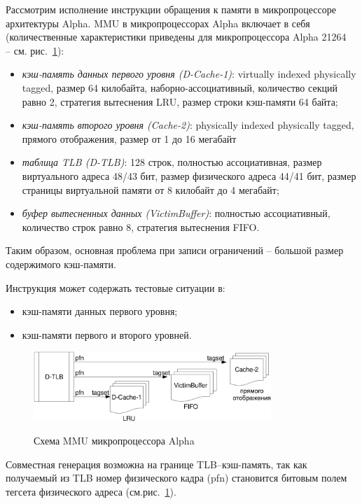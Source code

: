 \documentclass[14pt]{extreport}
\newcommand{\LRU}{\textsf{LRU}\xspace}
\newcommand{\FIFO}{\textsf{FIFO}\xspace}
\begin{document}
Рассмотрим исполнение инструкции обращения к памяти в
микропроцессоре архитектуры Alpha. MMU в микропроцессорах Alpha
включает в себя  (количественные характеристики приведены для
микропроцессора Alpha 21264~\cite{HennessyPatterson3rd} -- см.
рис.~\ref{alpha_mmu_scheme}):
\begin{itemize}
  \item \emph{кэш-память данных первого уровня (D-Cache-1)}:
  virtually indexed physically tagged, размер 64 килобайта,
  наборно-ассоциативный, количество секций равно 2, стратегия вытеснения
  \LRU, размер строки кэш-памяти 64 байта;
  \item \emph{кэш-память второго уровня (Cache-2)}: physically
  indexed physically tagged, прямого отображения, размер от 1 до 16
  мегабайт
  \item \emph{таблица TLB (D-TLB)}: 128 строк, полностью
  ассоциативная, размер виртуального адреса 48/43 бит, размер физического адреса
  44/41 бит, размер страницы виртуальной памяти от 8 килобайт до 4
  мегабайт;
  \item \emph{буфер вытесненных данных (VictimBuffer)}: полностью
  ассоциативный, количество строк равно 8, стратегия
  вытеснения \FIFO.
\end{itemize}
Таким образом, основная проблема при записи ограничений -- большой
размер содержимого кэш-памяти.

Инструкция может содержать тестовые ситуации в:
\begin{itemize}
  \item кэш-памяти данных первого уровня;
  \item кэш-памяти первого и второго уровней.
\end{itemize}

\begin{figure}[h] \center
  \includegraphics[width=0.8\textwidth]{4.analysis/alpha}\\
  \caption{Схема MMU микропроцессора Alpha}\label{alpha_mmu_scheme}
\end{figure}

Совместная генерация возможна на границе TLB--кэш-память, так как
получаемый из TLB номер физического кадра (pfn) становится битовым
полем тегсета физического адреса (см.рис.~\ref{alpha_mmu_scheme}).
\end{document}
